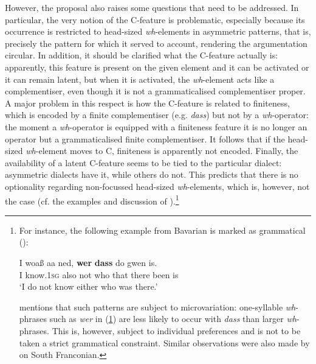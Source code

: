However, the proposal also raises some questions that need to be addressed. In particular, the very notion of the C-feature is problematic, especially because its occurrence is restricted to head-sized \textit{wh}-elements in asymmetric patterns, that is, precisely the pattern for which it served to account, rendering the argumentation circular. In addition, it should be clarified what the C-feature actually is: apparently, this feature is present on the given element and it can be activated or it can remain latent, but when it is activated, the \textit{wh}-element acts like a complementiser, even though it is not a grammaticalised complementiser proper. A major problem in this respect is how the C-feature is related to finiteness, which is encoded by a finite complementiser (e.g. \textit{dass}) but not by a \textit{wh}-operator: the moment a \textit{wh}-operator is equipped with a finiteness feature it is no longer an operator but a grammaticalised finite complementiser. It follows that if the head-sized \textit{wh}-element moves to C, finiteness is apparently not encoded. Finally, the availability of a latent C-feature seems to be tied to the particular dialect: asymmetric dialects have it, while others do not. This predicts that there is no optionality regarding non-focussed head-sized \textit{wh}-elements, which is, however, not the case (cf. the examples and discussion of \citealt[778]{weiss2013}).{\footnote{For instance, the following example from Bavarian is marked as grammatical (\citealt[778, ex. 15a]{weiss2013}):

\ea \gll I woaß aa ned, \textbf{wer} \textbf{dass} do gwen is. \label{werdassbavarian}\\
I know.\textsc{1sg} also not who that there been is\\
\glt `I do not know either who was there.'
\z

\citet[778]{weiss2013} mentions that such patterns are subject to microvariation: one-syllable \textit{wh}-phrases such as \textit{wer} in (\ref{werdassbavarian}) are less likely to occur with \textit{dass} than larger \textit{wh}-phrases. This is, however, subject to individual preferences and is not to be taken a strict grammatical constraint. Similar observations were also made by \citet[265]{roedder1936} on South Franconian.}}

